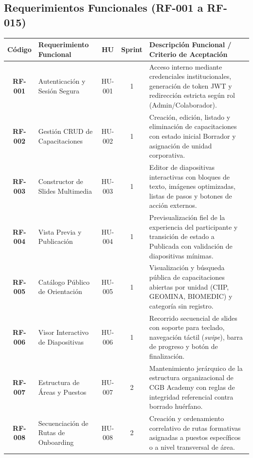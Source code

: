 \documentclass[11pt,a4paper]{article}
\begin{document}
\subsection{Requerimientos Funcionales (RF-001 a RF-015)}
\begin{table}[H]
\centering
\scriptsize
\renewcommand{\arraystretch}{1.2}
\begin{tabularx}{\linewidth}{|c|>{\raggedright\arraybackslash}p{3.4cm}|c|c|>{\raggedright\arraybackslash}X|}
\hline
\rowcolor{gray!15}
\textbf{Código} & \textbf{Requerimiento Funcional} & \textbf{HU} & \textbf{Sprint} & \textbf{Descripción Funcional / Criterio de Aceptación} \\
\hline
\textbf{RF-001} & Autenticación y Sesión Segura & HU-001 & 1 & Acceso interno mediante credenciales institucionales, generación de token JWT y redirección estricta según rol (Admin/Colaborador). \\
\hline
\textbf{RF-002} & Gestión CRUD de Capacitaciones & HU-002 & 1 & Creación, edición, listado y eliminación de capacitaciones con estado inicial Borrador y asignación de unidad corporativa. \\
\hline
\textbf{RF-003} & Constructor de Slides Multimedia & HU-003 & 1 & Editor de diapositivas interactivas con bloques de texto, imágenes optimizadas, listas de pasos y botones de acción externos. \\
\hline
\textbf{RF-004} & Vista Previa y Publicación & HU-004 & 1 & Previsualización fiel de la experiencia del participante y transición de estado a Publicada con validación de diapositivas mínimas. \\
\hline
\textbf{RF-005} & Catálogo Público de Orientación & HU-005 & 1 & Visualización y búsqueda pública de capacitaciones abiertas por unidad (CIIP, GEOMINA, BIOMEDIC) y categoría sin registro. \\
\hline
\textbf{RF-006} & Visor Interactivo de Diapositivas & HU-006 & 1 & Recorrido secuencial de slides con soporte para teclado, navegación táctil (\textit{swipe}), barra de progreso y botón de finalización. \\
\hline
\textbf{RF-007} & Estructura de Áreas y Puestos & HU-007 & 2 & Mantenimiento jerárquico de la estructura organizacional de CGB Academy con reglas de integridad referencial contra borrado huérfano. \\
\hline
\textbf{RF-008} & Secuenciación de Rutas de Onboarding & HU-008 & 2 & Creación y ordenamiento correlativo de rutas formativas asignadas a puestos específicos o a nivel transversal de área. \\

\end{tabularx}
\end{table}
\end{document}
